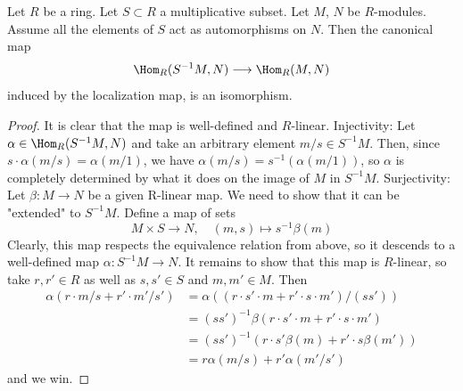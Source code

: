 \begin{lemma}
\label{lemma-universal-property-localization-module}
Let $R$ be a ring. Let $S \subset R$ a multiplicative subset. Let $M$, $N$
be $R$-modules. Assume all the elements of $S$ act as automorphisms on $N$.
Then the canonical map
$$
\Hom_R(S^{-1}M, N) \longrightarrow \Hom_R(M, N)
$$
induced by the localization map, is an isomorphism.
\end{lemma}

\begin{proof}
It is clear that the map is well-defined and $R$-linear.
Injectivity: Let $\alpha \in \Hom_R(S^{-1}M, N)$ and take an arbitrary
element $m/s \in S^{-1}M$. Then, since $s \cdot \alpha(m/s) = \alpha(m/1)$,
we have $ \alpha(m/s) =s^{-1}(\alpha (m/1))$, so $\alpha$ is completely
determined by what it does on the image of $M$ in $S^{-1}M$.
Surjectivity: Let $\beta : M \rightarrow N$ be a given R-linear map.
We need to show that it can be "extended" to $S^{-1}M$. Define a map of
sets
$$
M \times S \rightarrow N,\quad
(m,s) \mapsto s^{-1}\beta(m)
$$
Clearly, this map respects the equivalence relation from above, so it
descends to a well-defined map $\alpha : S^{-1}M \rightarrow N$.
It remains to show that this map is $R$-linear, so take
$r, r' \in R$ as well as $s, s' \in S$ and
$m, m' \in M$. Then
\begin{align*}
\alpha(r \cdot m/s + r' \cdot m' /s')
& =
\alpha((r \cdot s' \cdot m + r' \cdot s \cdot m') /(ss')) \\
& =
(ss')^{-1}\beta(r \cdot s' \cdot m + r' \cdot s \cdot m') \\
& =
(ss')^{-1} (r \cdot s' \beta (m) + r' \cdot s \beta (m')) \\
& =
r \alpha (m/s) + r' \alpha (m' /s')
\end{align*}
and we win.
\end{proof}

